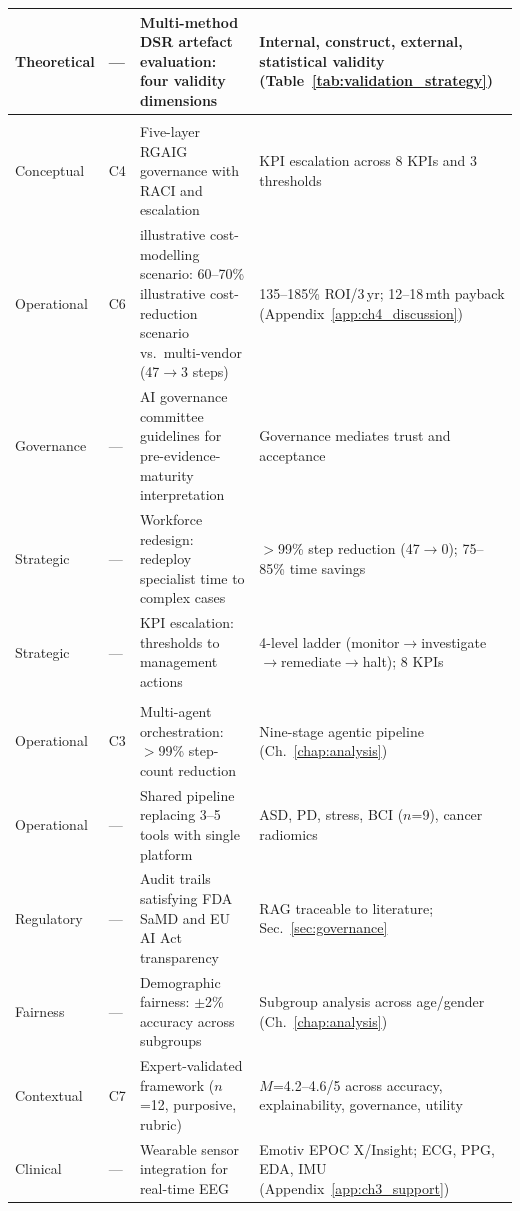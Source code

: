 \begin{table}[p]
\begin{tabularx}{\textwidth}{@{} >{\raggedright\arraybackslash}p{1.5cm} p{0.7cm} >{\raggedright\arraybackslash}p{4.4cm} X @{}}
\addlinespace
Theoretical & --- & Multi-method DSR artefact evaluation: four validity dimensions & Internal, construct, external, statistical validity (Table~\ref{tab:validation_strategy}) \\
\midrule
\multicolumn{4}{@{}p{\dimexpr\textwidth-2\tabcolsep}@{}}{\textbf{\color{ggunavy}Managerial Contributions}} \\
\midrule
Conceptual & C4 & Five-layer RGAIG governance with RACI and escalation & KPI escalation across 8 KPIs and 3 thresholds \\
\addlinespace
Operational & C6 & illustrative cost-modelling scenario: 60--70\% illustrative cost-reduction scenario vs.\ multi-vendor (47$\to$3 steps) & 135--185\% ROI/3\,yr; 12--18\,mth payback (Appendix~\ref{app:ch4_discussion}) \\
\addlinespace
Governance & --- & AI governance committee guidelines for pre-evidence-maturity interpretation & Governance mediates trust and acceptance \\
\addlinespace
Strategic & --- & Workforce redesign: redeploy specialist time to complex cases & $>$99\% step reduction (47$\to$0); 75--85\% time savings \\
\addlinespace
Strategic & --- & KPI escalation: thresholds to management actions & 4-level ladder (monitor$\to$investigate$\to$remediate$\to$halt); 8 KPIs \\
\midrule
\multicolumn{4}{@{}p{\dimexpr\textwidth-2\tabcolsep}@{}}{\textbf{\color{ggunavy}Practical Contributions}} \\
\midrule
Operational & C3 & Multi-agent orchestration: $>$99\% step-count reduction & Nine-stage agentic pipeline (Ch.~\ref{chap:analysis}) \\
\addlinespace
Operational & --- & Shared pipeline replacing 3--5 tools with single platform & ASD, PD, stress, BCI ($n$=9), cancer radiomics \\
\addlinespace
Regulatory & --- & Audit trails satisfying FDA SaMD and EU AI Act transparency & RAG traceable to literature; Sec.~\ref{sec:governance} \\
\addlinespace
Fairness & --- & Demographic fairness: $\pm$2\% accuracy across subgroups & Subgroup analysis across age/gender (Ch.~\ref{chap:analysis}) \\
\addlinespace
Contextual & C7 & Expert-validated framework ($n$=12, purposive, rubric) & $M$=4.2--4.6/5 across accuracy, explainability, governance, utility \\
\addlinespace
Clinical & --- & Wearable sensor integration for real-time EEG & Emotiv EPOC X/Insight; ECG, PPG, EDA, IMU (Appendix~\ref{app:ch3_support}) \\

\end{tabularx}
\end{table}
